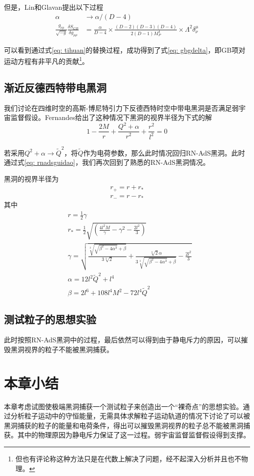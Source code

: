 但是，Lin和Glavan提出以下过程
\begin{align}
    \alpha&\rightarrow \alpha/\left(D-4\right) \label{eq: tihuan} \\
    \frac{g_{\nu \rho}}{\sqrt{-g}}\frac{\delta S_{GB}}{\delta g_{\mu \rho}}&=\frac{\alpha}{D-4} \times \frac{\left(D-2\right)\left(D-3\right)\left(D-4\right)}{2\left(D-1\right)M_P^4}\times \Lambda^2 \delta^\mu_\nu \label{eq: gbgdelta}
\end{align}

可以看到通过式\eqref{eq: tihuan}的替换过程，成功得到了式\eqref{eq: gbgdelta}，即GB项对运动方程有非平凡的贡献\footnote{但也有评论称这种方法只是在代数上解决了问题，经不起深入分析并且也不物理。}。
\subsection{渐近反德西特带电黑洞}
我们讨论在四维时空的高斯-博尼特引力下反德西特时空中带电黑洞是否满足弱宇宙监督假设。Fernandes给出了这种情况下黑洞的视界半径为下式的解\citep{fernandes2020charged}
\begin{equation}\label{eq: gbadsrfun}
    1-\frac{2M}{r}+\frac{Q^2+\alpha}{r^2}+\frac{r^2}{l^2}=0
\end{equation}

若采用$Q^2+\alpha \rightarrow \tilde{Q}^2 $，将$\tilde{Q}$作为电荷参数，那么此时情况回归RN-AdS黑洞。此时通过式\eqref{eq: rnadsguidao}，我们再次回到了熟悉的RN-AdS黑洞情况。

黑洞的视界半径为
\begin{align}
    r_+=r + r_* \label{eq: egbr+} \\
    r_-=r-r_* \label{eq: egbr-} 
\end{align}
其中
\begin{align*}
    &r = \frac{1}{2} \gamma \\
    &r_* = \frac{1}{2} \sqrt{(\frac{4 l^2
    M}{\gamma}-\gamma^2-\frac{2 l^2}{3})}  \\
    &\gamma = \sqrt{\frac{\sqrt[3]{\sqrt{\beta^2-4 \alpha^3}+\beta}}{3\sqrt[3]{2}}+\frac{\sqrt[3]{2} \alpha}{3 \sqrt[3]{\sqrt{\beta^2-4\alpha^3}+\beta}}-\frac{2 l^2}{3}} \\
    &\alpha =12 l^2 \tilde{Q}^2+l^4 \\ 
    &\beta =2 l^6 + 108 l^4 M^2 - 72 l^4 \tilde{Q}^2 
\end{align*}

\subsection{测试粒子的思想实验}
此时按照RN-AdS黑洞中的过程，最后依然可以得到由于静电斥力的原因，可以摧毁黑洞视界的粒子不能被黑洞捕获。

\section{本章小结}
本章考虑试图使极端黑洞捕获一个测试粒子来创造出一个“裸奇点”的思想实验。通过分析粒子运动中的守恒能量，无需具体求解粒子运动轨道的情况下讨论了可以被黑洞捕获的粒子的能量和电荷条件，得出可以摧毁黑洞视界的粒子总不能被黑洞捕获。其中的物理原因为静电斥力保证了这一过程。弱宇宙监督监督假设得到支撑。


